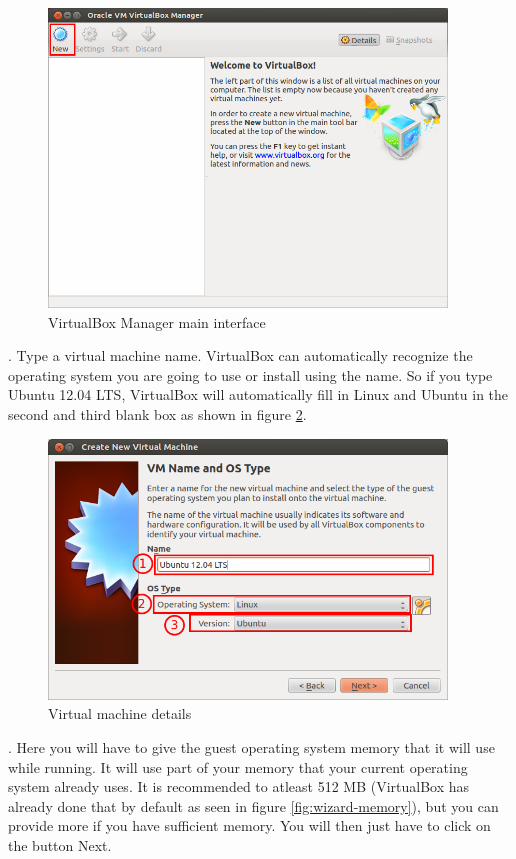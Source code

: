 \begin{figure}[!h]	
	\centering
	\includegraphics[width=300pt]{./images/installation/virtualbox/virtualbox-main.png}
	\caption{VirtualBox Manager main interface}	
	\label{fig:virtualbox-main}	
\end{figure}

\par {}. Type a virtual machine name. VirtualBox can automatically recognize the operating system you are going to use or install using the name. So if you type Ubuntu 12.04 LTS, VirtualBox will automatically fill in Linux and Ubuntu in the second and third blank box as shown in figure \ref{fig:wizard-newvirtual}. \\

\begin{figure}[!h]	
	\centering
	\includegraphics[width=300pt]{./images/installation/virtualbox/wizard-newvirtual.png}
	\caption{Virtual machine details}	
	\label{fig:wizard-newvirtual}	
\end{figure}

\par {}. Here you will have to give the guest operating system memory that it will use while running. It will use part of your memory that your current operating system already uses. It is recommended to atleast 512 MB (VirtualBox has already done that by default as seen in figure \ref{fig:wizard-memory}), but you can provide more if you have sufficient memory.  You will then just have to click on the button Next. \\

